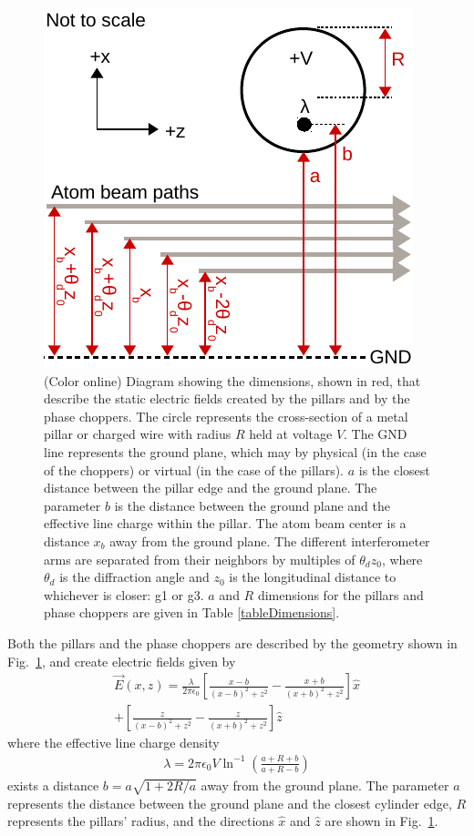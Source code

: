 \documentclass[twocolumn,prl,showpacs,superscriptaddress,longbibliography]{revtex4-1}   %
\newcommand{\figref}[1]{Fig.~\ref{#1}}
\begin{document}
\begin{figure}
\includegraphics[width=0.7\linewidth,keepaspectratio]{EDiagram2.pdf}
\caption{\label{EDiagram}(Color online) Diagram showing the dimensions, shown in red, that describe the static electric fields created by the pillars and by the phase choppers. The circle represents the cross-section of a metal pillar or charged wire with radius $R$ held at voltage $V$. The GND line represents the ground plane, which may by physical (in the case of the choppers) or virtual (in the case of the pillars). $a$ is the closest distance between the pillar edge and the ground plane. The parameter $b$ is the distance between the ground plane and the effective line charge within the pillar. The atom beam center is a distance $x_b$ away from the ground plane. The different interferometer arms are separated from their neighbors by multiples of $\theta_d z_0$, where $\theta_d$ is the diffraction angle and $z_0$ is the longitudinal distance to whichever is closer: g1 or g3. $a$ and $R$ dimensions for the pillars and phase choppers are given in Table \ref{tableDimensions}.}
\end{figure}

Both the pillars and the phase choppers are described by the geometry shown in \figref{EDiagram}, and create electric fields given by
\begin{align}
	\vec{E}(x,z) = \frac{\lambda}{2\pi\epsilon_0}
	\left[	
		\frac{x-b}{(x-b)^2+z^2} - \frac{x+b}{(x+b)^2+z^2}
	\right] \hat{x} \nonumber \\
	+ 
	\left[	
		\frac{z}{(x-b)^2+z^2} - \frac{z}{(x+b)^2+z^2}
	\right] \hat{z}
	\label{EPillars}
\end{align}
where the effective line charge density
\begin{align}
	\lambda = 2\pi\epsilon_0V\ln^{-1}
	\left(
		\frac{a+R+b}{a+R-b}
	\right)
	\label{lambda}
\end{align}
exists a distance $b = a\sqrt{1+2R/a}$ away from the ground plane. The parameter $a$ represents the distance between the ground plane and the closest cylinder edge, $R$ represents the pillars' radius, and the directions $\hat{x}$ and $\hat{z}$ are shown in \figref{EDiagram}.
\end{document}
